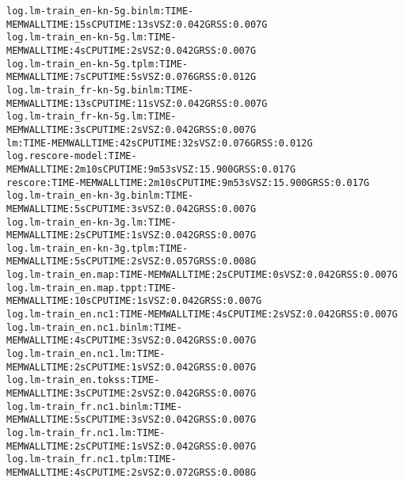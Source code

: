 \documentclass[11pt,letterpaper]{article}
\begin{document}
\begin{tiny}
\begin{alltt}
         log.lm-train_en-kn-5g.binlm:TIME-MEM                 WALL TIME: 15s      CPU TIME: 13s        VSZ: 0.042G    RSS: 0.007G
         log.lm-train_en-kn-5g.lm:TIME-MEM                    WALL TIME: 4s       CPU TIME: 2s         VSZ: 0.042G    RSS: 0.007G
         log.lm-train_en-kn-5g.tplm:TIME-MEM                  WALL TIME: 7s       CPU TIME: 5s         VSZ: 0.076G    RSS: 0.012G
         log.lm-train_fr-kn-5g.binlm:TIME-MEM                 WALL TIME: 13s      CPU TIME: 11s        VSZ: 0.042G    RSS: 0.007G
         log.lm-train_fr-kn-5g.lm:TIME-MEM                    WALL TIME: 3s       CPU TIME: 2s         VSZ: 0.042G    RSS: 0.007G
      lm:TIME-MEM                                             WALL TIME: 42s      CPU TIME: 32s        VSZ: 0.076G    RSS: 0.012G
         log.rescore-model:TIME-MEM                           WALL TIME: 2m10s    CPU TIME: 9m53s      VSZ: 15.900G   RSS: 0.017G
      rescore:TIME-MEM                                        WALL TIME: 2m10s    CPU TIME: 9m53s      VSZ: 15.900G   RSS: 0.017G
         log.lm-train_en-kn-3g.binlm:TIME-MEM                 WALL TIME: 5s       CPU TIME: 3s         VSZ: 0.042G    RSS: 0.007G
         log.lm-train_en-kn-3g.lm:TIME-MEM                    WALL TIME: 2s       CPU TIME: 1s         VSZ: 0.042G    RSS: 0.007G
         log.lm-train_en-kn-3g.tplm:TIME-MEM                  WALL TIME: 5s       CPU TIME: 2s         VSZ: 0.057G    RSS: 0.008G
         log.lm-train_en.map:TIME-MEM                         WALL TIME: 2s       CPU TIME: 0s         VSZ: 0.042G    RSS: 0.007G
         log.lm-train_en.map.tppt:TIME-MEM                    WALL TIME: 10s      CPU TIME: 1s         VSZ: 0.042G    RSS: 0.007G
         log.lm-train_en.nc1:TIME-MEM                         WALL TIME: 4s       CPU TIME: 2s         VSZ: 0.042G    RSS: 0.007G
         log.lm-train_en.nc1.binlm:TIME-MEM                   WALL TIME: 4s       CPU TIME: 3s         VSZ: 0.042G    RSS: 0.007G
         log.lm-train_en.nc1.lm:TIME-MEM                      WALL TIME: 2s       CPU TIME: 1s         VSZ: 0.042G    RSS: 0.007G
         log.lm-train_en.tokss:TIME-MEM                       WALL TIME: 3s       CPU TIME: 2s         VSZ: 0.042G    RSS: 0.007G
         log.lm-train_fr.nc1.binlm:TIME-MEM                   WALL TIME: 5s       CPU TIME: 3s         VSZ: 0.042G    RSS: 0.007G
         log.lm-train_fr.nc1.lm:TIME-MEM                      WALL TIME: 2s       CPU TIME: 1s         VSZ: 0.042G    RSS: 0.007G
         log.lm-train_fr.nc1.tplm:TIME-MEM                    WALL TIME: 4s       CPU TIME: 2s         VSZ: 0.072G    RSS: 0.008G

\end{alltt}
\end{tiny}
\end{document}
